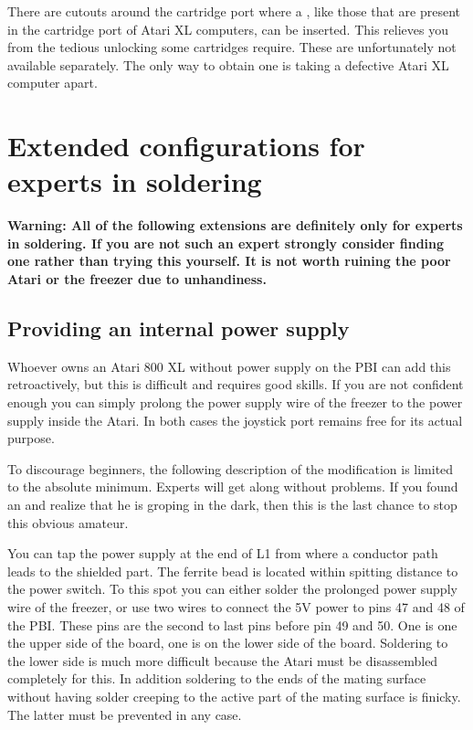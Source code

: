 There are cutouts around the cartridge port where a , like
those that are present in the cartridge port of Atari XL computers, can be
inserted. This relieves you from the tedious unlocking some cartridges require.
These  are unfortunately not available separately. The only
way to obtain one is taking a defective Atari XL computer apart.

\section{Extended configurations for experts in soldering}

{\bfseries Warning: All of the following extensions are definitely only for
experts in soldering. If you are not such an expert strongly consider
finding one rather than trying this yourself. It is not worth ruining the poor
Atari or the freezer due to unhandiness.}

\subsection{Providing an internal power supply}
\label{sec:add5vpbi}

Whoever owns an Atari 800 XL without power supply on the PBI can add this
retroactively, but this is difficult and requires good skills. If you are not
confident enough you can simply prolong the power supply wire of the freezer to
the power supply inside the Atari. In both cases the joystick port remains free
for its actual purpose.

To discourage beginners, the following description of the modification is
limited to the absolute minimum. Experts will get along without problems. If you
found an  and realize that he is groping in the dark, then this is
the last chance to stop this obvious amateur.

You can tap the power supply at the end of L1 from where a conductor path leads
to the shielded part. The ferrite bead is located within spitting distance to
the power switch. To this spot you can either solder the prolonged power supply
wire of the freezer, or use two wires to connect the 5V power to pins 47 and 48 of the PBI.
These pins are the second to last pins before pin 49 and 50. One is one the
upper side of the board, one is on the lower side of the board. Soldering to the
lower side is much more difficult because the Atari must be disassembled
completely for this. In addition soldering to the ends of the mating surface
without having solder creeping to the active part of the  mating surface is
finicky. The latter must be prevented in any case.

